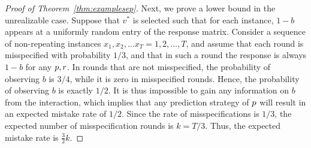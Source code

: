 \documentclass[11pt,letterpaper]{article}
\theoremstyle{definition}
\theoremstyle{plain}
\begin{document}
\begin{proof}[Proof of Theorem~\ref{thm:examplesep}]

Next, we prove a lower bound in the unrealizable case. Suppose that $v^*$ is selected such that for each instance, $1-b$ appears at a uniformly random entry of the response matrix. Consider a sequence of non-repeating instances $x_1,x_2,\ldots x_T = 1,2,\ldots, T$, and assume that each round is misspecified with probability $1/3$, and that in such a round the response is always $1-b$ for any ${p},{r}$. In rounds that are not misspecified, the probability of observing $b$ is $3/4$, while it is zero in misspecified rounds. Hence, the probability of observing $b$ is exactly $1/2$. It is thus impossible to gain any information on $b$ from the interaction, which implies that any prediction strategy of ${p}$ will result in an expected mistake rate of $1/2$. Since the rate of misspecifications is $1/3$, the expected number of misspecification rounds is $k = T/3$. Thus, the expected mistake rate is $\frac{3}{2}k$. 
\end{proof}


\iffalse
\end{document}
